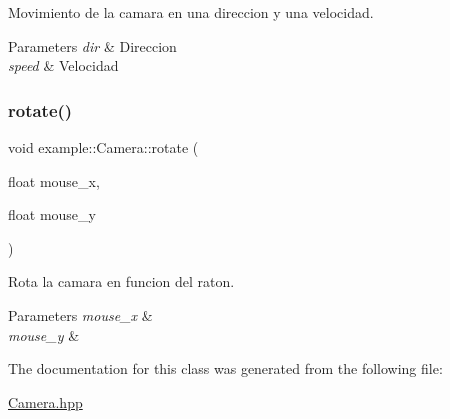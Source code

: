 Movimiento de la camara en una direccion y una velocidad. 


\begin{DoxyParams}{Parameters}
{\em dir} & Direccion \\
\hline
{\em speed} & Velocidad \\
\hline
\end{DoxyParams}
\mbox{\label{classexample_1_1_camera_ad28315b25725770ec0d63bc3aa2a671a}} 
\subsubsection{\texorpdfstring{rotate()}{rotate()}}
{\footnotesize\ttfamily void example\+::\+Camera\+::rotate (\begin{DoxyParamCaption}\item[{float}]{mouse\+\_\+x,  }\item[{float}]{mouse\+\_\+y }\end{DoxyParamCaption})}



Rota la camara en funcion del raton. 


\begin{DoxyParams}{Parameters}
{\em mouse\+\_\+x} & \\
\hline
{\em mouse\+\_\+y} & \\
\hline
\end{DoxyParams}


The documentation for this class was generated from the following file\+:\begin{DoxyCompactItemize}
\item 
\mbox{\hyperlink{_camera_8hpp}{Camera.\+hpp}}\end{DoxyCompactItemize}
